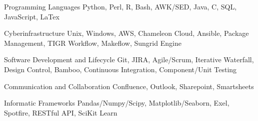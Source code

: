 

\begin{cvskills}

  \cvskill
    {Programming Languages} %
    {Python, Perl, R, Bash, AWK/SED, Java, C, SQL, JavaScript, LaTex} %

  \cvskill
    {Cyberinfrastructure} %
    {Unix, Windows, AWS, Chameleon Cloud, Ansible, Package Management, TIGR Workflow, Makeflow, Sungrid Engine} %

  \cvskill
    {Software Development and Lifecycle} %
    {Git, JIRA, Agile/Scrum, Iterative Waterfall, Design Control, Bamboo, Continuous Integration, Component/Unit Testing} %

    \cvskill
    {Communication and Collaboration}
    {Confluence, Outlook, Sharepoint, Smartsheets}

  \cvskill
    {Informatic Frameworks} %
    {Pandas/Numpy/Scipy, Matplotlib/Seaborn, Exel, Spotfire, RESTful API, SciKit Learn} %

\end{cvskills}
